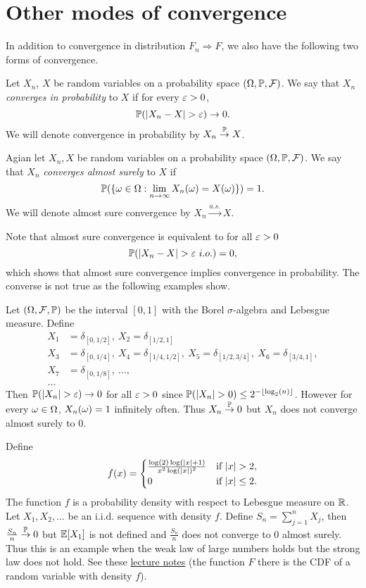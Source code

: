 \section{Other modes of convergence}
In addition to convergence in distribution $F_n \Rightarrow F$, we also have the following two forms of convergence.
\begin{defn}
    Let $X_n$, $X$ be random variables on a probability space $({{\Omega}},{\mathbb{P}},{\mathcal{F}})$. We say that $X_n$ \emph{converges in probability} to $X$ if for every $\varepsilon > 0$,
    \[{\mathbb{P}}({\left\lvert X_n-X\right\rvert} > \varepsilon) \to 0.\]
    We will denote convergence in probability by $X_n \stackrel{{\mathbb{P}}}{\to} X$.
\end{defn}
\begin{defn}
    Agian let $X_n,X$ be random variables on a probability space $({{\Omega}},{\mathbb{P}},{\mathcal{F}})$. We say that $X_n$ \emph{converges almost surely} to $X$ if 
    \[ {\mathbb{P}}(\{{\omega} \in {{\Omega}} : \lim_{n \to \infty} X_n({\omega}) = X({\omega})\} )=1.\]
    We will denote almost sure convergence by $X_n \stackrel{a.s.}{\to} X$.
\end{defn}
Note that almost sure convergence is equivalent to for all $\varepsilon > 0$
\[{\mathbb{P}}({\left\lvert X_n - X\right\rvert} > \varepsilon ~ i.o.)=0,\]
which shows that almost sure convergence implies convergence in probability. The converse is not true as the following examples show.
\begin{ex}
    Let $({{\Omega}},{\mathcal{F}},{\mathbb{P}})$ be the interval $[0,1]$ with the Borel $\sigma$-algebra and Lebesgue measure. Define
    \begin{align*}
        X_1 &= \delta_{[0,1/2]}, ~X_2 = \delta_{[1/2,1]}\\
        X_3 &= \delta_{[0,1/4]}, ~X_4 = \delta_{[1/4,1/2]}, ~ X_5 = \delta_{[1/2,3/4]}, ~ X_6 = \delta_{[3/4,1]},\\
        X_7 &= \delta_{[0,1/8]}, ~\ldots,\\
        \ldots &
    \end{align*}
    Then ${\mathbb{P}}({\left\lvert X_n\right\rvert} > \varepsilon) \to 0$ for all $\varepsilon > 0$ since ${\mathbb{P}}({\left\lvert X_n\right\rvert} > 0)\le 2^{-\lfloor \log_2(n) \rfloor}$. However for every ${\omega} \in {{\Omega}}$, $X_n({\omega}) = 1$ infinitely often. Thus $X_n \stackrel{{\mathbb{P}}}{\to} 0$ but $X_n$ does not converge almost surely to 0.
\end{ex}
\begin{ex}
    Define
    \[f(x) = \begin{cases}
        \frac{\log(2)\log({\left\lvert x\right\rvert}+1)}{x^2\log({\left\lvert x\right\rvert})^2} & \text{if } {\left\lvert x\right\rvert} > 2,\\
        0 & \text{if } {\left\lvert x\right\rvert} \le 2. \end{cases} \]
    The function $f$ is a probability density with respect to Lebesgue measure on ${\mathbb R}$. Let $X_1,X_2,\ldots $ be an i.i.d. sequence with density $f$. Define $S_n = \sum_{j=1}^n X_j$, then $\frac{S_n}{n} \stackrel{{\mathbb{P}}}{\to} 0$ but ${\mathbb{E}}[X_1]$ is not defined and $\frac{S_n}{n}$ does not converge to 0 almost surely. Thus this is an example when the weak law of large numbers holds but the strong law does not hold. See these \href{https://www.stat.umn.edu/geyer/8112/notes/weaklaw.pdf}{lecture notes} (the function $F$ there is the CDF of a random variable with density $f$).
\end{ex}
